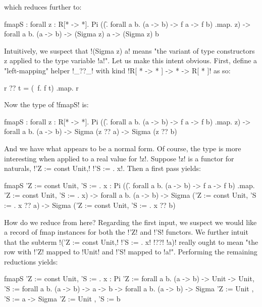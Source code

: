\documentclass[sigplan,10pt,anonymous,review]{acmart}\settopmatter{printfolios=true,printccs=false,printacmref=false}
\begin{document}
\Ni which reduces further to:

\begin{rosi}
fmapS : forall z : R[* -> *]. 
        Pi ((\f. forall a b. 
            (a -> b) -> f a -> f b) .map. z) -> 
        forall a b. (a -> b) -> (Sigma z) a -> (Sigma z) b
\end{rosi}

\Ni Intuitively, we suspect that !(Sigma z) a! means "the variant of type constructors z applied to the type variable !a!". Let us make this intent obvious. First, define a "left-mapping" helper !_??_!  with kind !R[ * -> * ] -> * -> R[ * ]!  as so:

\begin{rosi}
  r ?? t = (\ f. f t) .map. r
\end{rosi}

\Ni Now the type of !fmapS! is:

\begin{rosi}
fmapS : forall z : R[* -> *]. 
        Pi ((\f. forall a b. 
            (a -> b) -> f a -> f b) .map. z) -> 
        forall a b. (a -> b) -> Sigma (z ?? a) -> Sigma (z ?? b)
\end{rosi}

\Ni And we have what appears to be a normal form. Of course, the type is more interesting when applied to a real value for !z!. Suppose !z! is a functor for naturals, !{'Z := const Unit,! !'S := \x. x}!. Then a first pass yields:

\begin{rosi}
fmapS {'Z := const Unit, 'S := \x. x} : 
        Pi ((\f. forall a b. (a -> b) -> f a -> f b) 
          .map. {'Z := const Unit, 'S := \x. x}) -> 
        forall a b. (a -> b) -> 
        Sigma ({'Z := const Unit, 'S := \x. x} ?? a) -> 
        Sigma ({'Z := const Unit, 'S := \x. x} ?? b)
\end{rosi}

How do we reduce from here? Regarding the first input, we suspect we would like a record of fmap instances for both the !'Z! and !'S! functors. We further intuit that the subterm !({'Z := const Unit,! !'S := \x. x}! !??! !a)! really ought to mean "the row with !'Z! mapped to !Unit! and !'S! mapped to !a!". Performing the remaining reductions yields:

\begin{rosi}
fmapS {'Z := const Unit, 'S := \x. x} : 
        Pi {'Z := forall a b. (a -> b) -> Unit -> Unit, 
            'S := forall a b. (a -> b) -> a -> b} -> 
        forall a b. (a -> b) -> 
        Sigma {'Z := Unit , 'S := a} ->
        Sigma {'Z := Unit , 'S := b}
\end{rosi}
\end{document}
